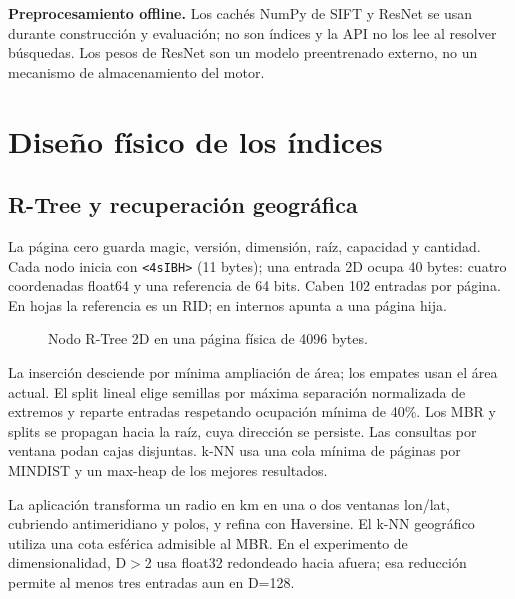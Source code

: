\documentclass[11pt,a4paper]{article}
\newcommand{\code}[1]{\texttt{#1}}
\begin{document}
\textbf{Preprocesamiento offline.} Los cachés NumPy de SIFT y ResNet se usan durante construcción y evaluación; no son índices y la API no los lee al resolver búsquedas. Los pesos de ResNet son un modelo preentrenado externo, no un mecanismo de almacenamiento del motor.

\section{Diseño físico de los índices}\label{sec:fis}
\subsection{R-Tree y recuperación geográfica}
La página cero guarda magic, versión, dimensión, raíz, capacidad y cantidad. Cada nodo inicia con \code{<4sIBH>} (11 bytes); una entrada 2D ocupa 40 bytes: cuatro coordenadas float64 y una referencia de 64 bits. Caben 102 entradas por página. En hojas la referencia es un RID; en internos apunta a una página hija.

\begin{figure}[H]\centering
{}
\caption{Nodo R-Tree 2D en una página física de 4096 bytes.}\label{fig:rtree}
\end{figure}

La inserción desciende por mínima ampliación de área; los empates usan el área actual. El split lineal elige semillas por máxima separación normalizada de extremos y reparte entradas respetando ocupación mínima de 40\%. Los MBR y splits se propagan hacia la raíz, cuya dirección se persiste. Las consultas por ventana podan cajas disjuntas. k-NN usa una cola mínima de páginas por MINDIST y un max-heap de los mejores resultados.

La aplicación transforma un radio en km en una o dos ventanas lon/lat, cubriendo antimeridiano y polos, y refina con Haversine. El k-NN geográfico utiliza una cota esférica admisible al MBR. En el experimento de dimensionalidad, D$>$2 usa float32 redondeado hacia afuera; esa reducción permite al menos tres entradas aun en D=128.
\end{document}
